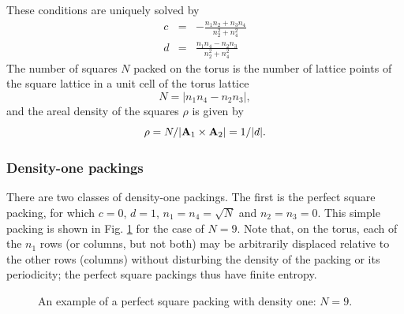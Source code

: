 \documentclass{umthesis}          %
\newcommand{\Ax}{{\bf A}_1}
\newcommand{\Ay}{{\bf A}_2}
\begin{document}
These conditions are uniquely solved by
\begin{eqnarray}\label{eq:gap}
c &=& - \frac{n_1 n_2 + n_3 n_4}{n_2^2 + n_4^2}\\
d &=& \frac{n_1 n_4 - n_2 n_3}{n_2^2 + n_4^2} \nonumber
\end{eqnarray}
The number of squares $N$ packed on the torus is the number of lattice points of the square lattice in a unit cell of the torus lattice
\begin{equation}
\label{eqn:N}
N = |n_1 n_4 - n_2 n_3|,
\end{equation}
and the areal density of the squares $\rho$ is given by
\begin{equation}
\label{ }
\rho=N/|\Ax \times \Ay| = 1/|d|.
\end{equation}

\subsubsection{Density-one packings}
\label{sec:densityOnePackings}
There are two classes of density-one packings.  The first is the perfect square packing, for which $c=0$, $d=1$, $n_1=n_4=\sqrt{N}$ and $n_2=n_3=0$.  This simple packing is shown in Fig. \ref{fig:N9} for the case of $N=9$.  Note that, on the torus, each of the $n_1$ rows (or columns, but not both) may be arbitrarily displaced relative to the other rows (columns) without disturbing the density of the packing or its periodicity; the perfect square packings thus have finite entropy.

\begin{figure}[h]
\label{fig:N9}
\caption{\label{fig:N9} An example of a perfect square packing with density one: $N=9$.}
\end{figure}
\end{document}
